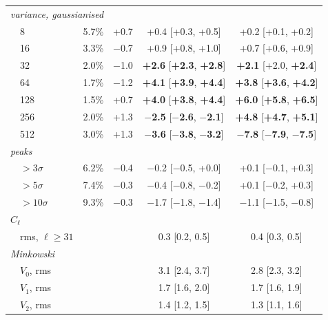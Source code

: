 \begin{table}
\begin{tabular}{llrrcc}
\hline
\multicolumn{6}{l}{\emph{variance, gaussianised}} \\
 & 8 & 5.7\% & +0.7 & +0.4 [+0.3, +0.5] & +0.2 [+0.1, +0.2] \\
 & 16 & 3.3\% & $-$0.7 & +0.9 [+0.8, +1.0] & +0.7 [+0.6, +0.9] \\
 & 32 & 2.0\% & $-$1.0 & \textbf{+2.6} [\textbf{+2.3}, \textbf{+2.8}] & \textbf{+2.1} [+2.0, \textbf{+2.4}] \\
 & 64 & 1.7\% & $-$1.2 & \textbf{+4.1} [\textbf{+3.9}, \textbf{+4.4}] & \textbf{+3.8} [\textbf{+3.6}, \textbf{+4.2}] \\
 & 128 & 1.5\% & +0.7 & \textbf{+4.0} [\textbf{+3.8}, \textbf{+4.4}] & \textbf{+6.0} [\textbf{+5.8}, \textbf{+6.5}] \\
 & 256 & 2.0\% & +1.3 & \textbf{$-$2.5} [\textbf{$-$2.6}, \textbf{$-$2.1}] & \textbf{+4.8} [\textbf{+4.7}, \textbf{+5.1}] \\
 & 512 & 3.0\% & +1.3 & \textbf{$-$3.6} [\textbf{$-$3.8}, \textbf{$-$3.2}] & \textbf{$-$7.8} [\textbf{$-$7.9}, \textbf{$-$7.5}] \\
\hline
\multicolumn{6}{l}{\emph{peaks}} \\
 & $>3\sigma$ & 6.2\% & $-$0.4 & $-$0.2 [$-$0.5, +0.0] & +0.1 [$-$0.1, +0.3] \\
 & $>5\sigma$ & 7.4\% & $-$0.3 & $-$0.4 [$-$0.8, $-$0.2] & +0.1 [$-$0.2, +0.3] \\
 & $>10\sigma$ & 9.3\% & $-$0.3 & $-$1.7 [$-$1.8, $-$1.4] & $-$1.1 [$-$1.5, $-$0.8] \\
\hline
\multicolumn{6}{l}{\emph{$C_\ell$}} \\
 & rms, $\ell\geq31$ &  &  & 0.3 [0.2, 0.5] & 0.4 [0.3, 0.5] \\
\hline
\multicolumn{6}{l}{\emph{Minkowski}} \\
 & $V_0$, rms &  &  & 3.1 [2.4, 3.7] & 2.8 [2.3, 3.2] \\
 & $V_1$, rms &  &  & 1.7 [1.6, 2.0] & 1.7 [1.6, 1.9] \\
 & $V_2$, rms &  &  & 1.4 [1.2, 1.5] & 1.3 [1.1, 1.6] \\
\hline
\end{tabular}
\end{table}
